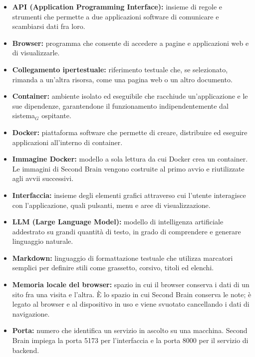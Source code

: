 \documentclass[a4paper, 10pt]{article}
\begin{document}
\begin{itemize}
    \item \textbf{API (Application Programming Interface):}
insieme di regole e strumenti che permette a due applicazioni software di comunicare e scambiarsi dati fra loro.

    \item \textbf{Browser:}
programma che consente di accedere a pagine e applicazioni web e di visualizzarle.

    \item \textbf{Collegamento ipertestuale:}
riferimento testuale che, se selezionato, rimanda a un'altra risorsa, come una pagina web o un altro documento.

    \item \textbf{Container:}
ambiente isolato ed eseguibile che racchiude un'applicazione e le sue dipendenze, garantendone il funzionamento indipendentemente dal sistema$_G$ ospitante.

    \item \textbf{Docker:}
piattaforma software che permette di creare, distribuire ed eseguire applicazioni all'interno di container.

    \item \textbf{Immagine Docker:}
modello a sola lettura da cui Docker crea un container. Le immagini di Second Brain vengono costruite al primo avvio e riutilizzate agli avvii successivi.

    \item \textbf{Interfaccia:}
insieme degli elementi grafici attraverso cui l'utente interagisce con l'applicazione, quali pulsanti, menu e aree di visualizzazione.

    \item \textbf{LLM (Large Language Model):}
modello di intelligenza artificiale addestrato su grandi quantità di testo, in grado di comprendere e generare linguaggio naturale.

    \item \textbf{Markdown:}
linguaggio di formattazione testuale che utilizza marcatori semplici per definire stili come grassetto, corsivo, titoli ed elenchi.

    \item \textbf{Memoria locale del browser:}
spazio in cui il browser conserva i dati di un sito fra una visita e l'altra. È lo spazio in cui Second Brain conserva le note; è legato al browser e al dispositivo in uso e viene svuotato cancellando i dati di navigazione.

    \item \textbf{Porta:}
numero che identifica un servizio in ascolto su una macchina. Second Brain impiega la porta 5173 per l'interfaccia e la porta 8000 per il servizio di backend.


\end{itemize}
\end{document}
